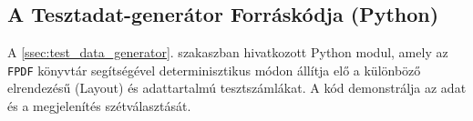 \appendix
\chapter*{\fuggelek}
\setcounter{chapter}{\appendixnumber}

\section{A Tesztadat-generátor Forráskódja (Python)}
\label{app:python_generator}

A \ref{ssec:test_data_generator}. szakaszban hivatkozott Python modul, amely az \texttt{FPDF} könyvtár segítségével determinisztikus módon állítja elő a különböző elrendezésű (Layout) és adattartalmú tesztszámlákat. A kód demonstrálja az adat és a megjelenítés szétválasztását.

